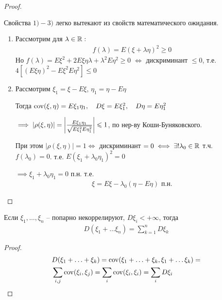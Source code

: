 \begin{proof}~

  Свойства $1) - 3)$ легко вытекают из свойств математического ожидания.

  \begin{enumerate}[start=4]
    \item 
      Рассмотрим для $\lambda \in \mathbb{R}:$
      \begin{align*}
        f(\lambda) = E(\xi + \lambda \eta)^2 \geq 0
      \end{align*}
      Но $f(\lambda) = E \xi^2 + 2E \xi \eta \lambda + \lambda^2 E \eta^2 \geq 0$
      $\iff$ дискриминант $\leq 0$, т.е.
      $4 [(E \xi \eta)^2 - E \xi^2 E\eta^2] \leq 0$

    \item 
      Рассмотрим $\xi_1 = \xi - E \xi$, $\eta_1 = \eta - E \eta$

      Тогда $\operatorname{cov}(\xi, \eta) = E \xi_1 \eta_1,\quad D \xi = E \xi_1^2,\quad D \eta = E\eta_1^2$

      $\implies |\rho(\xi, \eta)| = 
      \left | \frac{E \xi_1 \eta_1}{\sqrt{E \xi_1^2 E\eta_1^2}} \right | \leqslant 1$, 
      по нер-ву Коши-Буняковского.

      При этом $|\rho(\xi, \eta)| = 1 \iff$ дискриминант $= 0 
      \iff \exists ! \lambda_0 \in \mathbb{R}$ т.ч. $f(\lambda_0) = 0$. 
      т.е. $E(\xi_1 + \lambda_0 \eta_1)^2 = 0$

      $\implies \xi_1 + \lambda_0 \eta_1 = 0$ п.н. т.е.
      \begin{align*}
        \xi = E \xi - \lambda_0 (\eta - E \eta) \text{ п.н.}
      \end{align*}
  \end{enumerate}
\end{proof}

\begin{corollary}
  Если $\xi_1, \ldots, \xi_n$ -- попарно некоррелируют, $D \xi_i < +\infty$, тогда
  \begin{align*}
    D(\xi_1 + \ldots \xi_n) = \sum_{k = 1}^{n} D\xi_k
  \end{align*}
\end{corollary}

\begin{proof}
  \begin{align*}
    &D(\xi_1 + \ldots + \xi_k) = \operatorname{cov}(\xi_1 + \ldots + \xi_k, \xi_1 + \ldots \xi_k) =\\
    &\sum_{i, j} \operatorname{cov}(\xi_i, \xi_j) = \sum_i \operatorname{cov}(\xi_i, \xi_i) = \sum_{i} D \xi_i
  \end{align*}
\end{proof}

